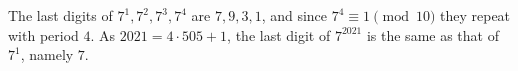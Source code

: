 The last digits of $7^1,7^2,7^3,7^4$ are $7,9,3,1$, and since $7^4\equiv1\pmod{10}$ they repeat with period $4$. As $2021=4\cdot505+1$, the last digit of $7^{2021}$ is the same as that of $7^1$, namely $\boxed{7}$.
